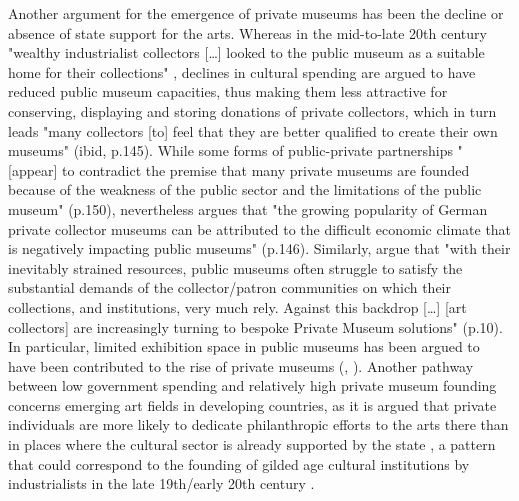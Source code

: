 \documentclass[11pt]{article}
\begin{document}
Another argument for the emergence of private museums has been the decline or absence of state support for the arts. 
Whereas in the mid-to-late 20th century "wealthy industrialist collectors [\ldots{}] looked to the public museum as a suitable home for their collections" \parencite[p.144]{Walker_2019_collector}, declines in cultural spending are argued to have reduced public museum capacities, thus making them less attractive for conserving, displaying and storing donations of private collectors, which in turn leads "many collectors [to] feel that they are better qualified to create their own museums" (ibid, p.145).
While some forms of public-private partnerships "[appear] to contradict the premise that many private museums are founded because of the weakness of the public sector and the limitations of the public museum" (p.150),  \textcite{Walker_2019_collector} nevertheless argues that "the growing popularity of German private collector museums can be attributed to the difficult economic climate that is negatively impacting public museums" (p.146). 
Similarly, \textcite{Boloten_Hacking_2021_foreword} argue that "with their inevitably strained resources, public museums often struggle to satisfy the substantial demands of the collector/patron communities on which their collections, and institutions, very much rely. Against this backdrop [\ldots{}] [art collectors] are increasingly turning to bespoke Private Museum solutions" (p.10). 
In particular, limited exhibition space in public museums has been argued to have been contributed to the rise of private museums (\cite[p.217]{Walker_2019_collector}, \cite[p.1]{Zorloni_Resch_2016_opportunities}). 
Another pathway between low government spending and relatively high private museum founding concerns emerging art fields in developing countries, as it is argued that private individuals are more likely to dedicate philanthropic efforts to the arts there than in places where the cultural sector is already supported by the state \parencite{Durand_2018_jumex,Bechtler_Imhof_2018_future,Boloten_Hacking_2021_foreword}, a pattern that could correspond to the founding of gilded age cultural institutions by industrialists in the late 19th/early 20th century \parencite{diMaggio_1982_boston,Adam_2004_philanthropy}. 
\end{document}
